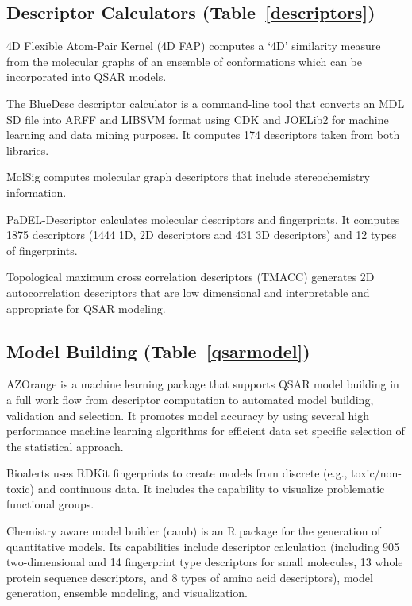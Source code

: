 \subsection*{Descriptor Calculators (Table~\ref{descriptors})}
4D Flexible Atom-Pair Kernel (4D FAP) computes a `4D' similarity measure from the molecular graphs of an ensemble of conformations which can be incorporated into QSAR models.

The BlueDesc descriptor calculator is a command-line tool that converts an MDL SD file into ARFF and LIBSVM format using CDK and JOELib2 for machine learning and data mining purposes. It computes 174 descriptors taken from both libraries.

MolSig \cite{Carbonell_2013} computes molecular graph descriptors that include stereochemistry information.

PaDEL-Descriptor  \cite{Yap_2010} calculates molecular descriptors and fingerprints. It computes 1875 descriptors (1444 1D, 2D descriptors and 431 3D descriptors) and 12 types of fingerprints. 

Topological maximum cross correlation descriptors (TMACC) \cite{Melville_2007} generates 2D autocorrelation descriptors that are low dimensional and interpretable and appropriate for QSAR modeling.

\subsection*{Model Building (Table~\ref{qsarmodel})}
AZOrange \cite{St_lring_2011} is a machine learning package that supports QSAR model building in a full work flow from descriptor computation to automated model building, validation and selection. It promotes model accuracy by using several high performance machine learning algorithms for efficient data set specific selection of the statistical approach.

Bioalerts \cite{Cortes_Ciriano_2016} uses RDKit fingerprints to create models from discrete (e.g., toxic/non-toxic) and continuous data.  It includes the capability to visualize problematic functional groups.

Chemistry aware model builder (camb) \cite{Murrell_2015} is an R package for the generation of quantitative models. Its capabilities include descriptor calculation (including 905 two-dimensional and 14 fingerprint type descriptors for small molecules, 13 whole protein sequence descriptors, and 8 types of amino acid descriptors), model generation, ensemble modeling, and visualization.

